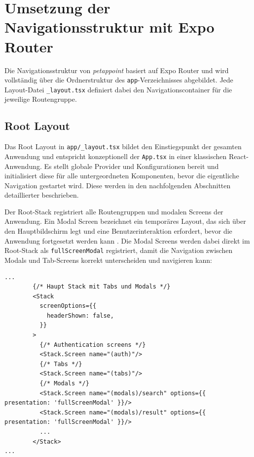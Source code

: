 \section{Umsetzung der Navigationsstruktur mit Expo Router}

Die Navigationsstruktur von \textit{petappoint} basiert auf Expo Router und wird vollständig über die Ordnerstruktur des \texttt{app}-Verzeichnisses abgebildet. Jede Layout-Datei \texttt{\_layout.tsx} definiert dabei den Navigationscontainer für die jeweilige Routengruppe.

\subsection{Root Layout}

Das Root Layout in \texttt{app/\_layout.tsx} bildet den Einstiegspunkt der gesamten Anwendung und entspricht konzeptionell der \texttt{App.tsx} in einer klassischen React-Anwendung. Es stellt globale Provider und Konfigurationen bereit und initialisiert diese für alle untergeordneten Komponenten, bevor die eigentliche Navigation gestartet wird. Diese werden in den nachfolgenden Abschnitten detaillierter beschrieben.

Der Root-Stack registriert alle Routengruppen und modalen Screens der Anwendung. Ein Modal Screen bezeichnet ein temporäres Layout, das sich über den Hauptbildschirm legt und eine Benutzerinteraktion erfordert, bevor die Anwendung fortgesetzt werden kann \cite{expo-modals}. Die Modal Screens werden dabei direkt im Root-Stack als \texttt{fullScreenModal} registriert, damit die Navigation zwischen Modals und Tab-Screens korrekt unterscheiden und navigieren kann:

\begin{listing}[H]
\begin{verbatim}
...
        {/* Haupt Stack mit Tabs und Modals */}
        <Stack
          screenOptions={{
            headerShown: false,
          }}
        >
          {/* Authentication screens */}
          <Stack.Screen name="(auth)"/>
          {/* Tabs */}
          <Stack.Screen name="(tabs)"/>
          {/* Modals */}
          <Stack.Screen name="(modals)/search" options={{ presentation: 'fullScreenModal' }}/>
          <Stack.Screen name="(modals)/result" options={{ presentation: 'fullScreenModal' }}/>
          ...
        </Stack>
...
\end{verbatim}
\caption{Registrierung der Routengruppen und der Modal Screens im Root-Stack}
\label{lst:root-stack}
\end{listing}

